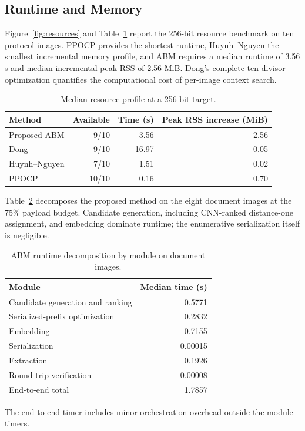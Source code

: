 \documentclass[a4paper,fleqn]{cas-dc}
\begin{document}
\subsection{Runtime and Memory}

Figure~\ref{fig:resources} and Table~\ref{tab:resources} report the 256-bit
resource benchmark on ten protocol images. PPOCP provides the shortest runtime,
Huynh--Nguyen the smallest incremental memory profile, and ABM requires a
median runtime of 3.56 s and median incremental peak RSS of 2.56 MiB.
Dong's complete ten-divisor optimization
quantifies the computational cost of per-image context search.

\begin{table}[t]
\centering
\caption{Median resource profile at a 256-bit target.}
\label{tab:resources}
\begin{tabular}{@{}lrrr@{}}
\toprule
\textbf{Method} & \textbf{Available} & \textbf{Time (s)} &
\textbf{Peak RSS increase (MiB)} \\
\midrule
Proposed ABM & 9/10 & 3.56 & 2.56 \\
Dong & 9/10 & 16.97 & 0.05 \\
Huynh--Nguyen & 7/10 & 1.51 & 0.02 \\
PPOCP & 10/10 & 0.16 & 0.70 \\
\bottomrule
\end{tabular}
\end{table}

Table~\ref{tab:abm-module-runtime} decomposes the proposed method on the eight
document images at the 75\% payload budget. Candidate generation, including
CNN-ranked distance-one assignment, and embedding dominate runtime; the
enumerative serialization itself is negligible.

\begin{table}[t]
\centering
\caption{ABM runtime decomposition by module on document images.}
\label{tab:abm-module-runtime}
\begin{tabular}{@{}lr@{}}
\toprule
\textbf{Module} & \textbf{Median time (s)} \\
\midrule
Candidate generation and ranking & 0.5771 \\
Serialized-prefix optimization & 0.2832 \\
Embedding & 0.7155 \\
Serialization & 0.00015 \\
Extraction & 0.1926 \\
Round-trip verification & 0.00008 \\
\midrule
End-to-end total & 1.7857 \\
\bottomrule
\end{tabular}
\vspace{2pt}
{\footnotesize\RaggedRight The end-to-end timer includes minor orchestration
overhead outside the module timers.\par}
\end{table}
\end{document}
